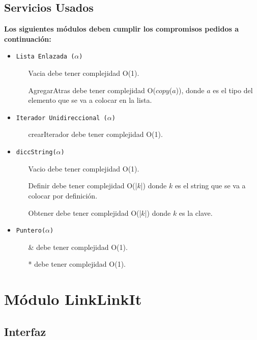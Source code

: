 \documentclass[10pt, a4paper]{article}
\let\TipoVariable=\texttt
\begin{document}
\subsection{Servicios Usados}

\textbf{Los siguientes m\'odulos deben cumplir los compromisos pedidos a continuaci\'on:}

\begin{itemize}
	\item \TipoVariable{Lista Enlazada ($\alpha$)}
	\begin{itemize}
		\item[Vacia] debe tener complejidad O(1).
		\item[AgregarAtras] debe tener complejidad O($copy$($a$)), donde $a$ es el tipo del elemento que se va a colocar en la lista.
	\end{itemize}

	\item \TipoVariable{Iterador Unidireccional ($\alpha$)}
	\begin{itemize}
		\item[crearIterador] debe tener complejidad O(1).
	\end{itemize}

	\item \TipoVariable{diccString($\alpha$)}
	\begin{itemize}
		\item[Vacio] debe tener complejidad O(1).
		\item[Definir] debe tener complejidad O(|$k$|) donde $k$ es el string que se va a colocar por definici\'on.
		\item[Obtener] debe tener complejidad O(|$k$|) donde $k$ es la clave.
	\end{itemize}

	\item \TipoVariable{Puntero($\alpha$)}
	\begin{itemize}
		\item[\&] debe tener complejidad O(1).
		\item[*] debe tener complejidad O(1).
	\end{itemize}
\end{itemize}

\section{M\'odulo LinkLinkIt}

\subsection{Interfaz}
	
\end{document}
